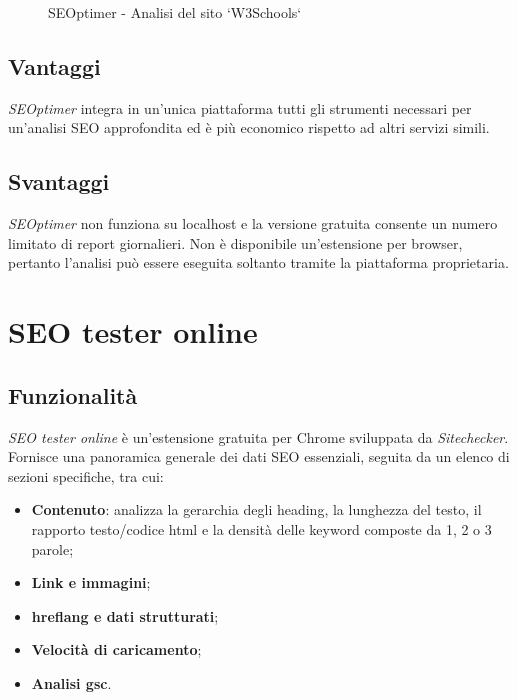 \begin{figure}[H]
    \centering 
    \caption{SEOptimer - Analisi del sito `W3Schools`}
\end{figure}

\subsection{Vantaggi}
\par \textit{SEOptimer} integra in un'unica piattaforma tutti gli strumenti necessari per un'analisi SEO approfondita ed è più economico rispetto ad altri servizi simili.

\subsection{Svantaggi}
\par \textit{SEOptimer} non funziona su \gls{localhost} e la versione gratuita consente un numero limitato di report giornalieri. Non è disponibile un'estensione per browser, pertanto l'analisi può essere eseguita soltanto tramite la piattaforma proprietaria.

\section{SEO tester online}

\subsection{Funzionalità}
\par \textit{SEO tester online} è un'estensione gratuita per Chrome sviluppata da \textit{Sitechecker}. Fornisce una panoramica generale dei dati SEO essenziali, seguita da un elenco di sezioni specifiche, tra cui:
\begin{itemize}
    \item \textbf{Contenuto}: analizza la gerarchia degli heading, la lunghezza del testo, il rapporto testo/codice \gls{html} e la densità delle keyword composte da 1, 2 o 3 parole;
    \item \textbf{Link e immagini};
    \item \textbf{\Gls{hreflang} e dati strutturati};
    \item \textbf{Velocità di caricamento};
    \item \textbf{Analisi \gls{gsc}}.
\end{itemize}

